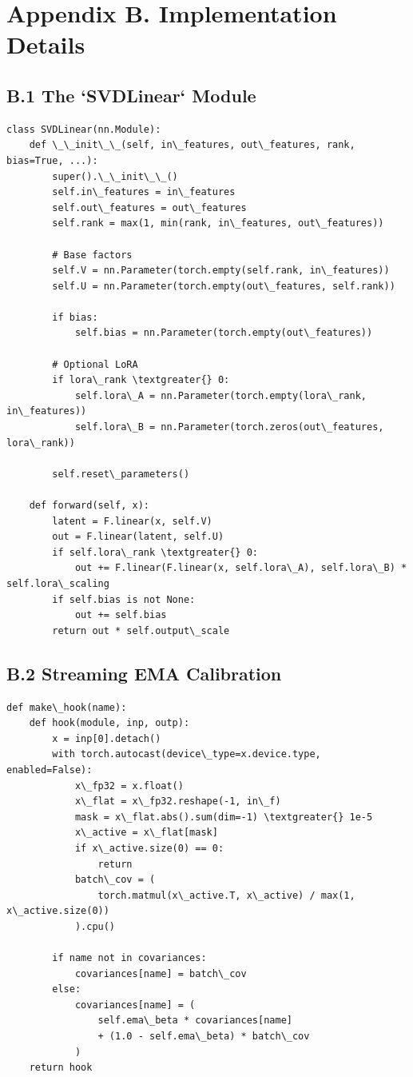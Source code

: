 
\section{Appendix B. Implementation Details}

\subsection{B.1 The `SVDLinear` Module}

\begin{lstlisting}
class SVDLinear(nn.Module):
    def \_\_init\_\_(self, in\_features, out\_features, rank, bias=True, ...):
        super().\_\_init\_\_()
        self.in\_features = in\_features
        self.out\_features = out\_features
        self.rank = max(1, min(rank, in\_features, out\_features))
        
        # Base factors
        self.V = nn.Parameter(torch.empty(self.rank, in\_features))
        self.U = nn.Parameter(torch.empty(out\_features, self.rank))
        
        if bias:
            self.bias = nn.Parameter(torch.empty(out\_features))
        
        # Optional LoRA
        if lora\_rank \textgreater{} 0:
            self.lora\_A = nn.Parameter(torch.empty(lora\_rank, in\_features))
            self.lora\_B = nn.Parameter(torch.zeros(out\_features, lora\_rank))
        
        self.reset\_parameters()
    
    def forward(self, x):
        latent = F.linear(x, self.V)
        out = F.linear(latent, self.U)
        if self.lora\_rank \textgreater{} 0:
            out += F.linear(F.linear(x, self.lora\_A), self.lora\_B) * self.lora\_scaling
        if self.bias is not None:
            out += self.bias
        return out * self.output\_scale
\end{lstlisting}

\subsection{B.2 Streaming EMA Calibration}

\begin{lstlisting}
def make\_hook(name):
    def hook(module, inp, outp):
        x = inp[0].detach()
        with torch.autocast(device\_type=x.device.type, enabled=False):
            x\_fp32 = x.float()
            x\_flat = x\_fp32.reshape(-1, in\_f)
            mask = x\_flat.abs().sum(dim=-1) \textgreater{} 1e-5
            x\_active = x\_flat[mask]
            if x\_active.size(0) == 0:
                return
            batch\_cov = (
                torch.matmul(x\_active.T, x\_active) / max(1, x\_active.size(0))
            ).cpu()
        
        if name not in covariances:
            covariances[name] = batch\_cov
        else:
            covariances[name] = (
                self.ema\_beta * covariances[name]
                + (1.0 - self.ema\_beta) * batch\_cov
            )
    return hook
\end{lstlisting}

